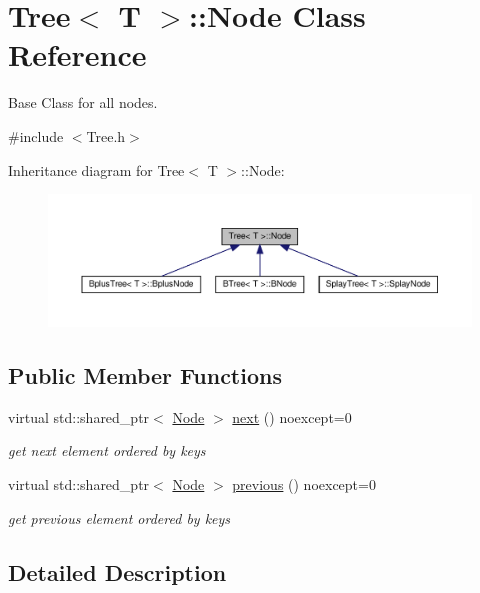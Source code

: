 \hypertarget{classTree_1_1Node}{}\section{Tree$<$ T $>$\+:\+:Node Class Reference}
\label{classTree_1_1Node}


Base Class for all nodes.  




{\ttfamily \#include $<$Tree.\+h$>$}



Inheritance diagram for Tree$<$ T $>$\+:\+:Node\+:
\nopagebreak
\begin{figure}[H]
\begin{center}
\leavevmode
\includegraphics[width=350pt]{classTree_1_1Node__inherit__graph}
\end{center}
\end{figure}
\subsection*{Public Member Functions}
\begin{DoxyCompactItemize}
\item 
virtual std\+::shared\+\_\+ptr$<$ \hyperlink{classTree_1_1Node}{Node} $>$ \hyperlink{classTree_1_1Node_a50f15b262b0d6c572904be68ba067ca6}{next} () noexcept=0
\begin{DoxyCompactList}\small\item\em get next element ordered by keys \end{DoxyCompactList}\item 
virtual std\+::shared\+\_\+ptr$<$ \hyperlink{classTree_1_1Node}{Node} $>$ \hyperlink{classTree_1_1Node_a3f912d90adc2c50de5ce7f96e6695c96}{previous} () noexcept=0
\begin{DoxyCompactList}\small\item\em get previous element ordered by keys \end{DoxyCompactList}\end{DoxyCompactItemize}


\subsection{Detailed Description}

